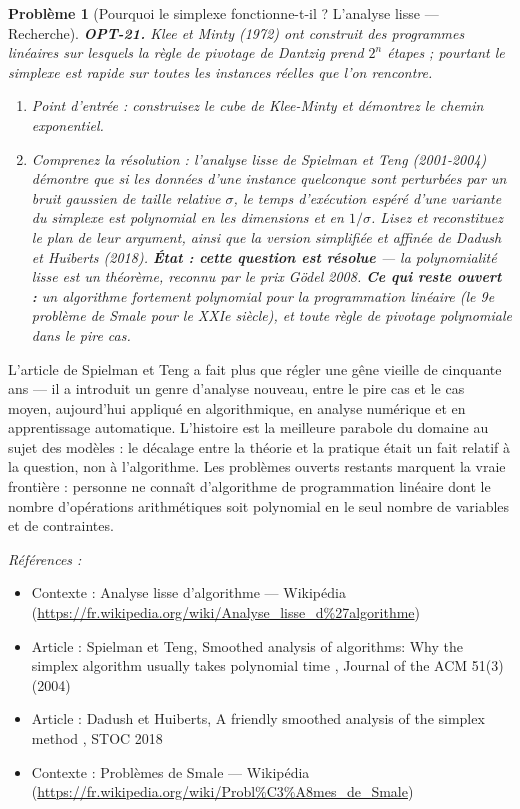 \documentclass[11pt]{article}
\newtheorem{problem}{Problème}
\newenvironment{refs}{\par\small\noindent\emph{Références :}\begin{itemize}\setlength\itemsep{0pt}}{\end{itemize}\normalsize}
\begin{document}
\bigskip

\begin{problem}[{Pourquoi le simplexe fonctionne-t-il ? L'analyse lisse --- Recherche}]
\textbf{OPT-21.} Klee et Minty (1972) ont construit des programmes linéaires sur lesquels la règle de pivotage de Dantzig prend $2^n$ étapes ; pourtant le simplexe est rapide sur toutes les instances réelles que l'on rencontre.
\begin{enumerate}
\item[(a)] Point d'entrée : construisez le cube de Klee-Minty et démontrez le chemin exponentiel.
\item[(b)] Comprenez la résolution : l'\textit{analyse lisse} de Spielman et Teng (2001-2004) démontre que si les données d'une instance quelconque sont perturbées par un bruit gaussien de taille relative $\sigma$, le temps d'exécution espéré d'une variante du simplexe est polynomial en les dimensions et en $1/\sigma$. Lisez et reconstituez le plan de leur argument, ainsi que la version simplifiée et affinée de Dadush et Huiberts (2018). \textbf{État : cette question est résolue} --- la polynomialité lisse est un théorème, reconnu par le prix Gödel 2008. \textbf{Ce qui reste ouvert :} un algorithme fortement polynomial pour la programmation linéaire (le 9e problème de Smale pour le XXIe siècle), et toute règle de pivotage polynomiale dans le pire cas.
\end{enumerate}

\end{problem}

\noindent L'article de Spielman et Teng a fait plus que régler une gêne vieille de cinquante ans --- il a introduit un genre d'analyse nouveau, entre le pire cas et le cas moyen, aujourd'hui appliqué en algorithmique, en analyse numérique et en apprentissage automatique. L'histoire est la meilleure parabole du domaine au sujet des modèles : le décalage entre la théorie et la pratique était un fait relatif à la question, non à l'algorithme. Les problèmes ouverts restants marquent la vraie frontière : personne ne connaît d'algorithme de programmation linéaire dont le nombre d'opérations arithmétiques soit polynomial en le seul nombre de variables et de contraintes.

\begin{refs}
\item Contexte : Analyse lisse d'algorithme --- Wikipédia (\url{https://fr.wikipedia.org/wiki/Analyse_lisse_d%27algorithme})
\item Article : Spielman et Teng, \og{} Smoothed analysis of algorithms: Why the simplex algorithm usually takes polynomial time \fg{}, Journal of the ACM 51(3) (2004)
\item Article : Dadush et Huiberts, \og{} A friendly smoothed analysis of the simplex method \fg{}, STOC 2018
\item Contexte : Problèmes de Smale --- Wikipédia (\url{https://fr.wikipedia.org/wiki/Probl%C3%A8mes_de_Smale})
\end{refs}
\end{document}
